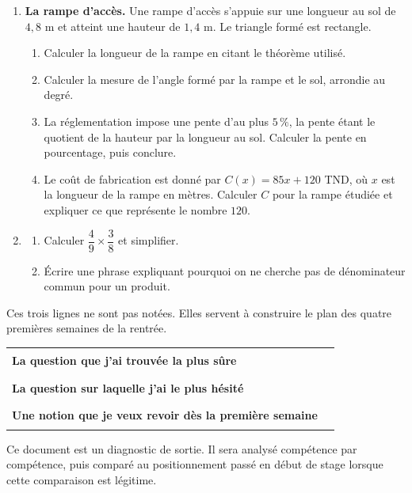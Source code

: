 \documentclass[10pt,a4paper]{article}
\begin{document}
\needspace{68mm}\par\vspace{3mm}
\begin{enumerate}
\needspace{22mm}
\item[\textbf{C1.}] \textbf{La rampe d'accès.} Une rampe d'accès s'appuie sur une longueur au sol de $4{,}8$ m
et atteint une hauteur de $1{,}4$ m. Le triangle formé est rectangle.
\begin{enumerate}
\item Calculer la longueur de la rampe en citant le théorème utilisé.
\item Calculer la mesure de l'angle formé par la rampe et le sol, arrondie au degré.
\item La réglementation impose une pente d'au plus $5\,\%$, la pente étant le quotient de la hauteur par la
longueur au sol. Calculer la pente en pourcentage, puis conclure.
\item Le coût de fabrication est donné par $C(x) = 85x + 120$ TND, où $x$ est la longueur de la rampe en mètres.
Calculer $C$ pour la rampe étudiée et expliquer ce que représente le nombre $120$.
\end{enumerate}
\par\vspace{1.2mm}
\needspace{22mm}
\item[\textbf{C2.}] \begin{enumerate}
\item Calculer $\dfrac{4}{9}\times\dfrac{3}{8}$ et simplifier.
\item Écrire une phrase expliquant pourquoi on ne cherche pas de dénominateur commun pour un produit.
\end{enumerate}
\par\vspace{1.2mm}
\end{enumerate}
\brouillon{\dimexpr\textheight/3\relax}
\newpage
{}
\begin{methodbox}Ces trois lignes ne sont pas notées. Elles servent à construire le plan des quatre premières semaines de la rentrée.\end{methodbox}
\par\noindent\begin{tabularx}{\linewidth}{>{\bfseries}p{62mm} X}
\toprule
La question que j'ai trouvée la plus sûre & \rule{85mm}{0.32pt} \\
La question sur laquelle j'ai le plus hésité & \rule{85mm}{0.32pt} \\
Une notion que je veux revoir dès la première semaine & \rule{85mm}{0.32pt} \\
\bottomrule\end{tabularx}
\vfill
\begin{graybox}\small Ce document est un diagnostic de sortie. Il sera analysé compétence par compétence, puis comparé au positionnement passé en début de stage lorsque cette comparaison est légitime.\end{graybox}
\end{document}
